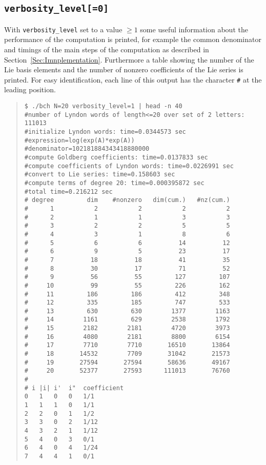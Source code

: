 \documentclass[11pt,a4paper]{article}
\begin{document}
\subsection*{\tt verbosity\_level[=0]}
With \verb|verbosity_level| set to a value $\geq 1$ some useful information about
the performance of the computation is printed, for example the common denominator 
and timings of the main steps of the computation as described in Section~\ref{Sec:Imnplementation}. Furthermore a table showing the number of the
Lie basis elements and the number of nonzero coefficients of the Lie series is printed.
For easy identification, each line of this output has the character \verb|#| at the leading position.

\begin{quote} %
{\small\begin{BVerbatim}
$ ./bch N=20 verbosity_level=1 | head -n 40
#number of Lyndon words of length<=20 over set of 2 letters: 111013
#initialize Lyndon words: time=0.0344573 sec
#expression=log(exp(A)*exp(A))
#denominator=102181884343418880000
#compute Goldberg coefficients: time=0.0137833 sec
#compute coefficients of Lyndon words: time=0.0226991 sec
#convert to Lie series: time=0.158603 sec
#compute terms of degree 20: time=0.000395872 sec
#total time=0.216212 sec
# degree         dim    #nonzero   dim(cum.)   #nz(cum.)
#      1           2           2           2           2
#      2           1           1           3           3
#      3           2           2           5           5
#      4           3           1           8           6
#      5           6           6          14          12
#      6           9           5          23          17
#      7          18          18          41          35
#      8          30          17          71          52
#      9          56          55         127         107
#     10          99          55         226         162
#     11         186         186         412         348
#     12         335         185         747         533
#     13         630         630        1377        1163
#     14        1161         629        2538        1792
#     15        2182        2181        4720        3973
#     16        4080        2181        8800        6154
#     17        7710        7710       16510       13864
#     18       14532        7709       31042       21573
#     19       27594       27594       58636       49167
#     20       52377       27593      111013       76760
#
# i	|i|	i'	i"	coefficient
0	1	0	0	1/1
1	1	1	0	1/1
2	2	0	1	1/2
3	3	0	2	1/12
4	3	2	1	1/12
5	4	0	3	0/1
6	4	0	4	1/24
7	4	4	1	0/1
\end{BVerbatim}
}\end{quote}
\end{document}
